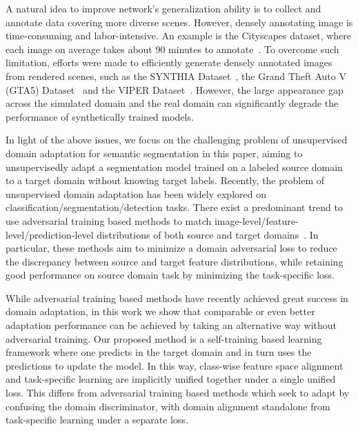 \documentclass[runningheads]{llncs}
\begin{document}
A natural idea to improve network's generalization ability is to collect and annotate data covering more diverse scenes. However, densely annotating image is time-consuming and labor-intensive. An example is the Cityscapes dataset, where each image on average takes about 90 minutes to annotate~\cite{cordts2016cityscapes}. To overcome such limitation, efforts were made to efficiently generate densely annotated images from rendered scenes, such as the SYNTHIA Dataset~\cite{ros2016synthia}, the Grand Theft Auto V (GTA5) Dataset~\cite{richter2016playing} and the VIPER Dataset~\cite{richter2017playing}. However, the large appearance gap across the simulated domain and the real domain can significantly degrade the performance of synthetically trained models.

In light of the above issues, we focus on the challenging problem of unsupervised domain adaptation for semantic segmentation in this paper, aiming to unsupervisedly adapt a segmentation model trained on a labeled source domain to a target domain without knowing target labels. Recently, the problem of unsupervised domain adaptation has been widely explored on classification/segmentation/detection tasks. There exist a predominant trend to use adversarial training based methods to match image-level/feature-level/prediction-level distributions of both source and target domains~\cite{ganin2016domain,bousmalis2016domain,hoffman2016fcns,Chen_2017_ICCV,sankaranarayanan2017unsupervised, tsai2018learning}. In particular, these methods aim to minimize a domain adversarial loss to reduce the discrepancy between source and target feature distributions, while retaining good performance on source domain task by minimizing the task-specific loss.

While adversarial training based methods have recently achieved great success in domain adaptation, in this work we show that comparable or even better adaptation performance can be achieved by taking an alternative way without adversarial training. Our proposed method is a self-training based learning framework where one predicts in the target domain and in turn uses the predictions to update the model. In this way, class-wise feature space alignment and task-specific learning are implicitly unified together under a single unified loss. This differs from adversarial training based methods which seek to adapt by confusing the domain discriminator, with domain alignment standalone from task-specific learning under a separate loss.
\end{document}
